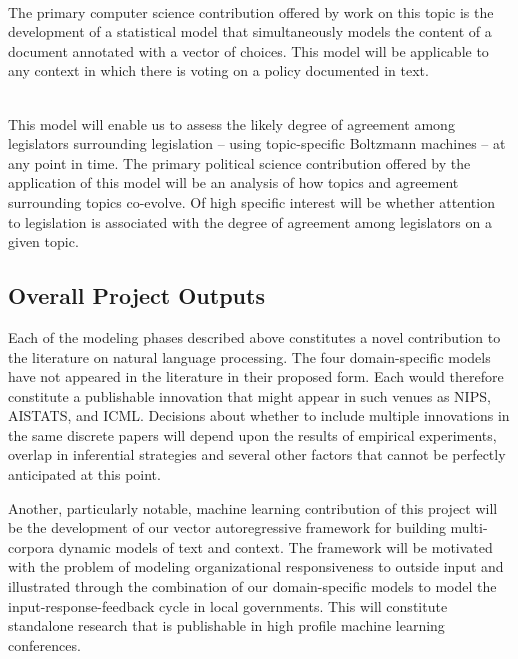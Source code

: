 ~\\
 The primary computer
science contribution offered by work on this topic is the development
of a statistical model that simultaneously models the content of a
document annotated with a vector of choices. This model will be
applicable to any context in which there is voting on a policy
documented in text.

~\\
 This model will enable us to assess the likely degree of agreement among legislators surrounding legislation -- using topic-specific Boltzmann machines -- at any point in time. The primary political science contribution offered by the application of this model will be an analysis of how topics and agreement surrounding topics co-evolve. Of high specific interest will be whether attention to legislation is associated with the degree of agreement among legislators on a given topic.




\subsection{Overall Project Outputs}

Each of the modeling phases described above constitutes a novel contribution to the literature on natural language processing. The four domain-specific models have not appeared in the literature in their proposed form. Each would therefore constitute a publishable innovation that might appear in such venues as NIPS, AISTATS, and ICML. Decisions about whether to include multiple innovations in the same discrete papers will depend upon the results of empirical experiments, overlap in inferential strategies and several other factors that cannot be perfectly anticipated at this point.

Another, particularly notable, machine learning contribution of this project will be the development of our vector autoregressive framework for building multi-corpora dynamic models of text and context. The framework will be motivated with the problem of modeling organizational responsiveness to outside input and illustrated through the combination of our domain-specific models to model the input-response-feedback cycle in local governments. This will constitute standalone research that is publishable in high profile machine learning conferences.

